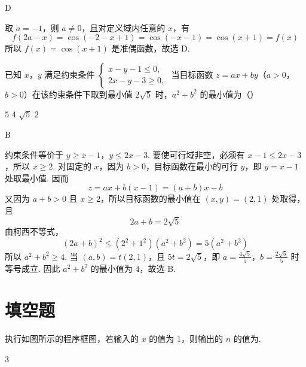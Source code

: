 \begin{answer}
D
\end{answer}

\begin{solution}
取 \(a=-1\)，则 \(a\ne0\)，且对定义域内任意的 \(x\)，有
\[
f(2a-x)=\cos(-2-x+1)=\cos(-x-1)=\cos(x+1)=f(x)
\]
所以 \(f(x)=\cos(x+1)\) 是准偶函数，故选 D.
\end{solution}

\begin{problem}
已知 \(x\)，\(y\) 满足约束条件 \(\begin{cases}
x - y - 1 \leqslant 0,\\
2x - y - 3 \geqslant 0,
\end{cases}\) 当目标函数 \(z = ax + by\)（\(a > 0\)，\(b > 0\)）在该约束条件下取到最小值 \(2\sqrt{5}\) 时，\(a^2 + b^2\) 的最小值为（\quad）

\choices
    {\(5\)}
    {\(4\)}
    {\(\sqrt{5}\)}
    {\(2\)}
\end{problem}

\begin{answer}
B
\end{answer}

\begin{solution}
约束条件等价于
\(y\geqslant x-1\)，\(y\leqslant2x-3\).
要使可行域非空，必须有 \(x-1\leqslant2x-3\)，所以 \(x\geqslant2\). 对固定的 \(x\)，因为 \(b>0\)，目标函数在最小的可行 \(y\)，即 \(y=x-1\) 处取最小值. 因而
\[
z=ax+b(x-1)=(a+b)x-b
\]
又因为 \(a+b>0\) 且 \(x\geqslant2\)，所以目标函数的最小值在 \((x,y)=(2,1)\) 处取得，且
\[
2a+b=2\sqrt5
\]
由柯西不等式，
\[
(2a+b)^2\leqslant(2^2+1^2)(a^2+b^2)=5(a^2+b^2)
\]
所以 \(a^2+b^2\geqslant4\). 当 \((a,b)=t(2,1)\)，且 \(5t=2\sqrt5\)，即
\(a=\frac{4\sqrt5}{5}\)，\(b=\frac{2\sqrt5}{5}\)
时等号成立. 因此 \(a^2+b^2\) 的最小值为 \(4\)，故选 B.
\end{solution}

\section{填空题}

\begin{problem}
执行如图所示的程序框图，若输入的 \(x\) 的值为 1，则输出的 \(n\) 的值为\fillinblank{}.
\parbox{\dimexpr\linewidth-\problembodyindent\relax}{%
    \centering
}
\end{problem}

\begin{answer}
\(3\)
\end{answer}

